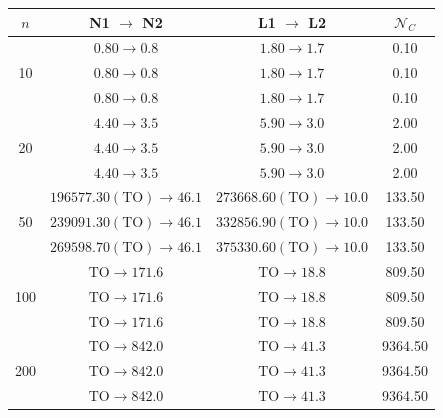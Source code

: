 \begin{table}[h] \centering
    \begin{tabular}{c|c|c|c}
        \toprule
        $n$ & N1 $\rightarrow$ N2 & L1 $\rightarrow$ L2 & $\mathcal{N}_C$ \\
        \midrule

        \multirow{3}{*}{10}
            & $0.80 \rightarrow 0.8$ & $1.80 \rightarrow 1.7$ & 0.10 \\
            & $0.80 \rightarrow 0.8$ & $1.80 \rightarrow 1.7$ & 0.10 \\
            & $0.80 \rightarrow 0.8$ & $1.80 \rightarrow 1.7$ & 0.10 \\

        \cmidrule(lr){1-4}

        \multirow{3}{*}{20}
            & $4.40 \rightarrow 3.5$ & $5.90 \rightarrow 3.0$ & 2.00 \\
            & $4.40 \rightarrow 3.5$ & $5.90 \rightarrow 3.0$ & 2.00 \\
            & $4.40 \rightarrow 3.5$ & $5.90 \rightarrow 3.0$ & 2.00 \\

        \cmidrule(lr){1-4}

        \multirow{3}{*}{50}
            & $196577.30(\mathrm{TO}) \rightarrow 46.1$ & $273668.60(\mathrm{TO}) \rightarrow 10.0$ & 133.50 \\
            & $239091.30(\mathrm{TO}) \rightarrow 46.1$ & $332856.90(\mathrm{TO}) \rightarrow 10.0$ & 133.50 \\
            & $269598.70(\mathrm{TO}) \rightarrow 46.1$ & $375330.60(\mathrm{TO}) \rightarrow 10.0$ & 133.50 \\

        \cmidrule(lr){1-4}

        \multirow{3}{*}{100} 
            & $\mathrm{TO} \rightarrow 171.6$ & $\mathrm{TO} \rightarrow 18.8$ & 809.50 \\
            & $\mathrm{TO} \rightarrow 171.6$ & $\mathrm{TO} \rightarrow 18.8$ & 809.50 \\
            & $\mathrm{TO} \rightarrow 171.6$ & $\mathrm{TO} \rightarrow 18.8$ & 809.50 \\

        \cmidrule(lr){1-4}

        \multirow{3}{*}{200}
            & $\mathrm{TO} \rightarrow 842.0$ & $\mathrm{TO} \rightarrow 41.3$ & 9364.50 \\
            & $\mathrm{TO} \rightarrow 842.0$ & $\mathrm{TO} \rightarrow 41.3$ & 9364.50 \\
            & $\mathrm{TO} \rightarrow 842.0$ & $\mathrm{TO} \rightarrow 41.3$ & 9364.50 \\


\end{tabular}
\end{table}
